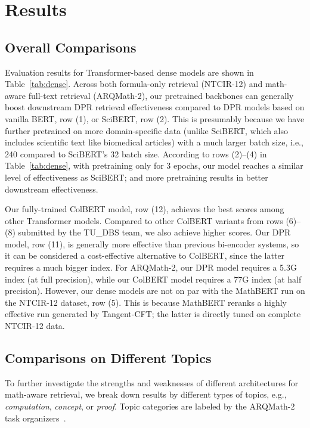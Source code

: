 \documentclass[11pt]{article}
\begin{document}
\section{Results}

\subsection{Overall Comparisons}
\label{sect:comp}
Evaluation results for Transformer-based dense models are shown in Table~\ref{tab:dense}.
Across both formula-only retrieval (NTCIR-12) and math-aware full-text retrieval (ARQMath-2), our pretrained backbones can generally boost downstream DPR retrieval effectiveness compared to DPR models based on vanilla BERT, row (1), or SciBERT, row (2).
This is presumably because we have further pretrained on more domain-specific data (unlike SciBERT, which also includes scientific text like biomedical articles) with a much larger batch size, i.e., 240 compared to SciBERT's 32 batch size.
According to rows (2)--(4) in Table~\ref{tab:dense}, with pretraining only for 3 epochs, our model reaches a similar level of effectiveness as SciBERT; and more pretraining results in better downstream effectiveness.

Our fully-trained ColBERT model, row (12), achieves the best scores among other Transformer models.
Compared to other ColBERT variants from rows (6)--(8) submitted by the TU\_DBS team, we also achieve higher scores.
Our DPR model, row (11), is generally more effective than previous bi-encoder systems, so it can be considered a cost-effective alternative to ColBERT, since the latter requires a much bigger index.
For ARQMath-2, our DPR model requires a 5.3G index (at full precision), while our ColBERT model requires a 77G index (at half precision).
However, our dense models are not on par with the MathBERT run on the NTCIR-12 dataset, row (5).
This is because MathBERT reranks a highly effective run generated by Tangent-CFT; the latter is directly tuned on complete NTCIR-12 data.

\subsection{Comparisons on Different Topics}

To further investigate the strengths and weaknesses of different architectures for math-aware retrieval, we break down results by different types of topics, e.g., \textit{computation}, \textit{concept}, or \textit{proof}.
Topic categories are labeled by the ARQMath-2 task organizers~\cite{mansouri2021arqmath2review}.
\end{document}
